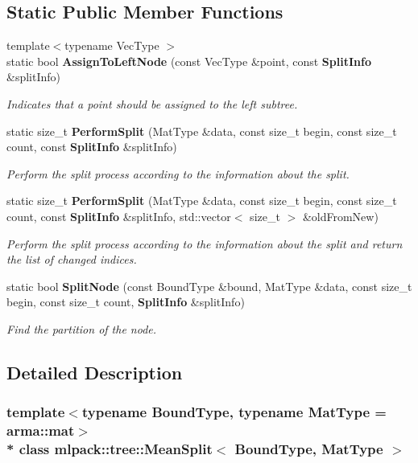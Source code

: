 \subsection*{Static Public Member Functions}
\begin{DoxyCompactItemize}
\item 
{\footnotesize template$<$typename Vec\+Type $>$ }\\static bool {\bf Assign\+To\+Left\+Node} (const Vec\+Type \&point, const {\bf Split\+Info} \&split\+Info)
\begin{DoxyCompactList}\small\item\em Indicates that a point should be assigned to the left subtree. \end{DoxyCompactList}\item 
static size\+\_\+t {\bf Perform\+Split} (Mat\+Type \&data, const size\+\_\+t begin, const size\+\_\+t count, const {\bf Split\+Info} \&split\+Info)
\begin{DoxyCompactList}\small\item\em Perform the split process according to the information about the split. \end{DoxyCompactList}\item 
static size\+\_\+t {\bf Perform\+Split} (Mat\+Type \&data, const size\+\_\+t begin, const size\+\_\+t count, const {\bf Split\+Info} \&split\+Info, std\+::vector$<$ size\+\_\+t $>$ \&old\+From\+New)
\begin{DoxyCompactList}\small\item\em Perform the split process according to the information about the split and return the list of changed indices. \end{DoxyCompactList}\item 
static bool {\bf Split\+Node} (const Bound\+Type \&bound, Mat\+Type \&data, const size\+\_\+t begin, const size\+\_\+t count, {\bf Split\+Info} \&split\+Info)
\begin{DoxyCompactList}\small\item\em Find the partition of the node. \end{DoxyCompactList}\end{DoxyCompactItemize}


\subsection{Detailed Description}
\subsubsection*{template$<$typename Bound\+Type, typename Mat\+Type = arma\+::mat$>$\\*
class mlpack\+::tree\+::\+Mean\+Split$<$ Bound\+Type, Mat\+Type $>$}

